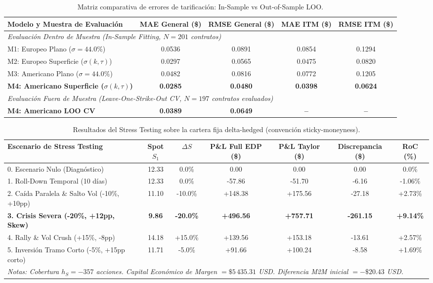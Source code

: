 \documentclass[11pt,a4paper]{article}
\begin{document}
\begin{table}[htbp]
\centering
\begin{tabular}{lcccc}
\toprule
\textbf{Modelo y Muestra de Evaluación} & \textbf{MAE General (\$)} & \textbf{RMSE General (\$)} & \textbf{MAE ITM (\$)} & \textbf{RMSE ITM (\$)} \\
\midrule
\multicolumn{5}{l}{\textit{Evaluación Dentro de Muestra (In-Sample Fitting, $N=201$ contratos)}} \\
M1: Europeo Plano ($\sigma = 44.0\%$) & 0.0536 & 0.0891 & 0.0854 & 0.1294 \\
M2: Europeo Superficie ($\sigma(k,\tau)$) & 0.0297 & 0.0565 & 0.0475 & 0.0820 \\
M3: Americano Plano ($\sigma = 44.0\%$) & 0.0482 & 0.0816 & 0.0772 & 0.1205 \\
\textbf{M4: Americano Superficie ($\sigma(k,\tau)$)} & \textbf{0.0285} & \textbf{0.0480} & \textbf{0.0398} & \textbf{0.0624} \\
\midrule
\multicolumn{5}{l}{\textit{Evaluación Fuera de Muestra (Leave-One-Strike-Out CV, $N=197$ contratos evaluados)}} \\
\textbf{M4: Americano LOO CV} & \textbf{0.0389} & \textbf{0.0649} & \textbf{--} & \textbf{--} \\
\bottomrule
\end{tabular}
\caption{Matriz comparativa de errores de tarificación: In-Sample vs Out-of-Sample LOO.}
\end{table}

\begin{table}[htbp]
\centering
\small
\begin{tabular}{lcccccc}
\toprule
\textbf{Escenario de Stress Testing} & \textbf{Spot $S_1$} & \textbf{$\Delta S$} & \textbf{P\&L Full EDP (\$)} & \textbf{P\&L Taylor (\$)} & \textbf{Discrepancia (\$)} & \textbf{RoC (\%)} \\
\midrule
0. Escenario Nulo (Diagnóstico) & 12.33 & 0.0\% & 0.00 & 0.00 & 0.00 & 0.0\% \\
1. Roll-Down Temporal (10 días) & 12.33 & 0.0\% & -57.86 & -51.70 & -6.16 & -1.06\% \\
2. Caída Paralela \& Salto Vol (-10\%, +10pp) & 11.10 & -10.0\% & +148.38 & +175.56 & -27.18 & +2.73\% \\
\textbf{3. Crisis Severa (-20\%, +12pp, Skew)} & \textbf{9.86} & \textbf{-20.0\%} & \textbf{+496.56} & \textbf{+757.71} & \textbf{-261.15} & \textbf{+9.14\%} \\
4. Rally \& Vol Crush (+15\%, -8pp) & 14.18 & +15.0\% & +139.56 & +153.18 & -13.61 & +2.57\% \\
5. Inversión Tramo Corto (-5\%, +15pp corto) & 11.71 & -5.0\% & +91.66 & +100.24 & -8.58 & +1.69\% \\
\midrule
\multicolumn{7}{l}{\textit{Notas: Cobertura $h_S = -357$ acciones. Capital Económico de Margen $= \$5\,435.31$ USD. Diferencia M2M inicial $= -\$20.43$ USD.}} \\
\bottomrule
\end{tabular}
\caption{Resultados del Stress Testing sobre la cartera fija delta-hedged (convención sticky-moneyness).}
\end{table}
\end{document}
